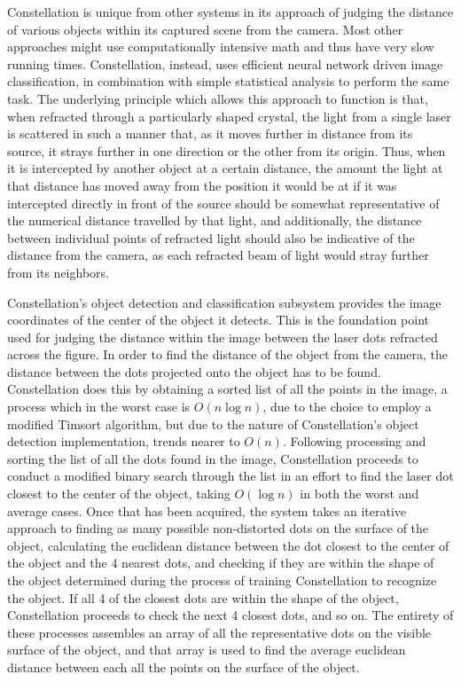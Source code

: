 \def\code#1{\texttt{#1}}
\makeatletter
Constellation is unique from other systems in its approach of judging the distance of various objects within its captured scene from the camera. Most other approaches might use computationally intensive math and thus have very slow running times. Constellation, instead, uses efficient neural network driven image classification, in combination with simple statistical analysis to perform the same task. The underlying principle which allows this approach to function is that, when refracted through a particularly shaped crystal, the light from a single laser is scattered in such a manner that, as it moves further in distance from its source, it strays further in one direction or the other from its origin. Thus, when it is intercepted by another object at a certain distance, the amount the light at that distance has moved away from the position it would be at if it was intercepted directly in front of the source should be somewhat representative of the numerical distance travelled by that light, and additionally, the distance between individual points of refracted light should also be indicative of the distance from the camera, as each refracted beam of light would stray further from its neighbors.

Constellation's object detection and classification subsystem provides the image coordinates of the center of the object it detects. This is the foundation point used for judging the distance within the image between the laser dots refracted across the figure. In order to find the distance of the object from the camera, the distance between the dots projected onto the object has to be found. Constellation does this by obtaining a sorted list of all the points in the image, a process which in the worst case is $O(n\log n)$, due to the choice to employ a modified Timsort algorithm, but due to the nature of Constellation's object detection implementation, trends nearer to $O(n)$. Following processing and sorting the list of all the dots found in the image, Constellation proceeds to conduct a modified binary search through the list in an effort to find the laser dot closest to the center of the object, taking $O(\log n)$ in both the worst and average cases. Once that has been acquired, the system takes an iterative approach to finding as many possible non-distorted dots on the surface of the object, calculating the euclidean distance between the dot closest to the center of the object and the 4 nearest dots, and checking if they are within the shape of the object determined during the process of training Constellation to recognize the object. If all 4 of the closest dots are within the shape of the object, Constellation proceeds to check the next 4 closest dots, and so on. The entirety of these processes assembles an array of all the representative dots on the visible surface of the object, and that array is used to find the average euclidean distance between each all the points on the surface of the object.

